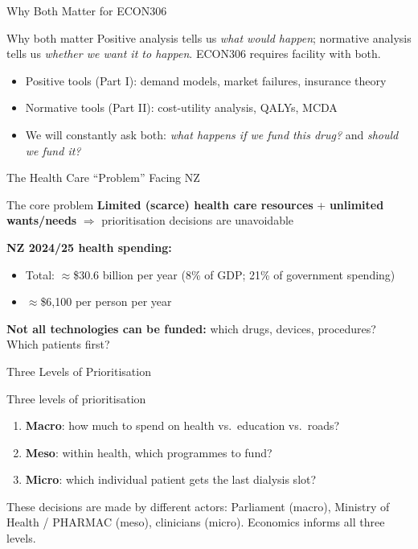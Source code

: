 \documentclass[aspectratio=169, 12pt]{beamer}
\begin{document}
\begin{frame}{Why Both Matter for ECON306}
  \begin{exampleblock}{Why both matter}
    Positive analysis tells us \emph{what would happen}; normative analysis tells us
    \emph{whether we want it to happen}. ECON306 requires facility with both.
  \end{exampleblock}
  \vspace{0.8em}
  \begin{itemize}
    \item Positive tools (Part I): demand models, market failures, insurance theory
    \item Normative tools (Part II): cost-utility analysis, QALYs, MCDA
    \item We will constantly ask both: \emph{what happens if we fund this drug?} and
          \emph{should we fund it?}
  \end{itemize}
\end{frame}

\begin{frame}{The Health Care ``Problem'' Facing NZ}
  \begin{block}{The core problem}
    \textbf{Limited (scarce) health care resources} + \textbf{unlimited wants/needs}
    $\Rightarrow$ prioritisation decisions are unavoidable
  \end{block}
  \vspace{0.5em}
  \textbf{NZ 2024/25 health spending:}
  \begin{itemize}
    \item Total: $\approx$\$30.6 billion per year (8\% of GDP; 21\% of government spending)
    \item $\approx$\$6,100 per person per year
  \end{itemize}
  \vspace{0.4em}
  \textbf{Not all technologies can be funded:} which drugs, devices, procedures? Which patients first?
\end{frame}

\begin{frame}{Three Levels of Prioritisation}
  \begin{alertblock}{Three levels of prioritisation}
    \begin{enumerate}
      \item \textbf{Macro}: how much to spend on health vs.\ education vs.\ roads?
      \item \textbf{Meso}: within health, which programmes to fund?
      \item \textbf{Micro}: which individual patient gets the last dialysis slot?
    \end{enumerate}
  \end{alertblock}
  \vspace{0.6em}
  These decisions are made by different actors: Parliament (macro), Ministry of Health /
  PHARMAC (meso), clinicians (micro). Economics informs all three levels.
\end{frame}
\end{document}
